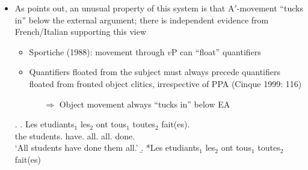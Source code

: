 \documentclass[letterpaper,10pt]{handout_nick}
\begin{document}
\begin{itemize}
\item As \citet{muller10} points out, an unusual property of this system is that A$'$-movement ``tucks in'' below the external argument; there is independent evidence from French/Italian supporting this view
\begin{itemize}
\item Sportiche (1988): movement through $v$P can ``float'' quantifiers 
\item Quantifiers floated from the subject must always precede quantifiers floated from fronted object clitics, irrespective of PPA (Cinque 1999: 116)
\begin{itemize}
\item[$\Rightarrow$] Object movement always ``tucks in'' below EA
\end{itemize}
\end{itemize}
\ex. \ag. Les etudiants$_1$ les$_2$ ont tous$_1$ toutes$_2$ fait(es).\\
the students.  have. all. all. done.\\
`All students have done them all.'
\b. *Les etudiants$_1$ les$_2$ ont tous$_1$ toutes$_2$ fait(es)


\begin{comment}
\item This (potentially) captures the well know specificity requirements PPA with clitics and \emph{wh}-phrases (\citealt{deprez98}), given that mixed A/A$'$-movement is associated with specificity 
\ex. \ag. Combien de fautes a-t-elle faites?\\
how.many of mistakes has-\SC{3.f.sg} made.\SC{pl}\\
`How many (amongst a known set of) mistakes has she made?'
\bg. Combien de fautes a-t-elle fait?\\
how.many of mistakes has-\SC{3.f.sg} made\\
`What is the number of things that are mistakes and that she has made them'\\
(\citealt{deprez98}: 8)

\ex. \ag. Parmis ces toiles, combien {\bf en}-a-t-il volontairement d\'etruit({\bf es}).\\
among these paintings how.many of.them.\SC{cl}-has.\SC{3.sg}-\SC{3.sg.m} voluntarily destroyed.\SC{pl}\\
`Among these paintings, how many did he willingly destroy?'
\bg. Plus vous avez recu de lettres, moins vous {\bf en} avez \'ecrit{\bf (*es)}.\\
more \SC{2.pl} have.\SC{2.pl} received less \SC{2.pl} of.them.\SC{cl} have.\SC{2.pl} written.\SC{pl}\\
`The more letters you received, the fewer you wrote.'\\
(\citealt{deprez98}: 10f.)

\end{comment}
\end{itemize}
\end{document}
